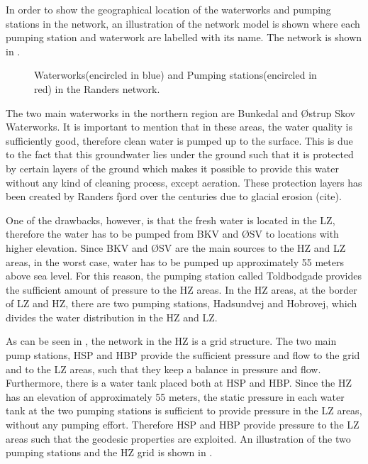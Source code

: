 In order to show the geographical location of the waterworks and pumping stations in the network, an illustration of the network model is shown where each pumping station and waterwork are labelled with its name. The network is shown in .

\begin{figure}[H]
\centering
 
\caption{Waterworks(encircled in blue) and Pumping stations(encircled in red) in the Randers network.}
\label{fig:pumping_stations_and_waterworks}
\end{figure}

The two main waterworks in the northern region are Bunkedal and Østrup Skov Waterworks. It is important to mention that in these areas, the water quality is sufficiently good, therefore clean water is pumped up to the surface. This is due to the fact that this groundwater lies under the ground such that it is protected by certain layers of the ground which makes it possible to provide this water without any kind of cleaning process, except aeration. These protection layers has been created by Randers fjord over the centuries due to glacial erosion (cite).

One of the drawbacks, however, is that the fresh water is located in the LZ, therefore the water has to be pumped from BKV and ØSV to locations with higher elevation. Since BKV and ØSV are the main sources to the HZ and LZ areas, in the worst case, water has to be pumped up approximately 55 meters above sea level. For this reason, the pumping station called Toldbodgade provides the sufficient amount of pressure to the HZ areas. In the HZ areas, at the border of LZ and HZ, there are two pumping stations, Hadsundvej and Hobrovej, which divides the water distribution in the HZ and LZ. 

As can be seen in , the network in the HZ is a grid structure. The two main pump stations, HSP and HBP provide the sufficient pressure and flow to the grid and to the LZ areas, such that they keep a balance in pressure and flow. Furthermore, there is a water tank placed both at HSP and HBP. Since the HZ has an elevation of approximately 55 meters, the static pressure in each water tank at the two pumping stations is sufficient to provide pressure in the LZ areas, without any pumping effort. Therefore HSP and HBP provide pressure to the LZ areas such that the geodesic properties are exploited. An illustration of the two pumping stations and the HZ grid is shown in . 

